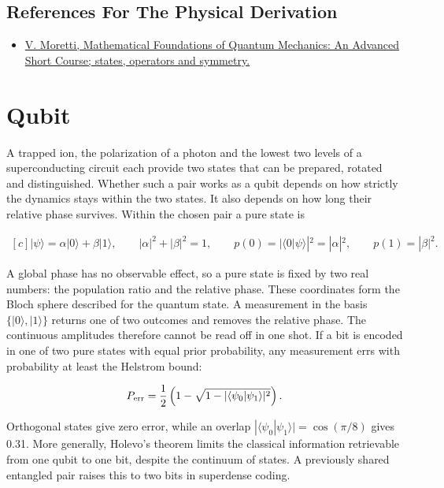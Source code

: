\documentclass[11pt,oneside]{book}
\newenvironment{centeredalign}{\[\begin{gathered}[c]}{\end{gathered}\]}
\newcommand{\ket}[1]{\lvert #1\rangle}
\begin{document}
\subsection*{References For The Physical Derivation}
\begin{itemize}
\item \href{https://arxiv.org/abs/1508.06951}{V. Moretti, Mathematical Foundations of Quantum Mechanics: An Advanced Short Course; states, operators and symmetry.}
\end{itemize}





\clearpage

\section{Qubit}

\label{topic:qubit}

A trapped ion, the polarization of a photon and the lowest two levels of a superconducting circuit each provide two states that can be prepared, rotated and distinguished. Whether such a pair works as a qubit depends on how strictly the dynamics stays within the two states. It also depends on how long their relative phase survives. Within the chosen pair a pure state is

\begin{centeredalign}
\ket\psi=\alpha\ket0+\beta\ket1,\qquad |\alpha|^2+|\beta|^2=1,\qquad
p(0)=|\langle0|\psi\rangle|^2=|\alpha|^2,\qquad p(1)=|\beta|^2.
\end{centeredalign}

A global phase has no observable effect, so a pure state is fixed by two real numbers: the population ratio and the relative phase. These coordinates form the Bloch sphere described for the quantum state. A measurement in the basis \(\{\ket0,\ket1\}\) returns one of two outcomes and removes the relative phase. The continuous amplitudes therefore cannot be read off in one shot. If a bit is encoded in one of two pure states with equal prior probability, any measurement errs with probability at least the Helstrom bound:

\begin{centeredalign}
P_{\rm err}=\frac12\left(1-\sqrt{1-|\langle\psi_0|\psi_1\rangle|^2}\right).
\end{centeredalign}

Orthogonal states give zero error, while an overlap \(|\langle\psi_0|\psi_1\rangle|=\cos(\pi/8)\) gives 0.31. More generally, Holevo's theorem limits the classical information retrievable from one qubit to one bit, despite the continuum of states. A previously shared entangled pair raises this to two bits in superdense coding.
\end{document}
